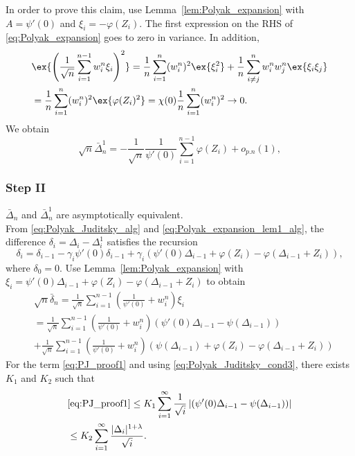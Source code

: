 In order to prove this claim, use Lemma~\ref{lem:Polyak_expansion} with $A = \psi'(0)$ and $\xi_i = -\varphi(Z_i)$. The first expression on the RHS of \eqref{eq:Polyak_expansion} goes to zero in variance. In addition, 
\begin{align*}
& \ex{ \left( \frac{1}{\sqrt{n}} \sum_{i=1}^{n-1} w_i^n \xi_i \right)^2 }  = \frac{1}{n}  \sum_{i=1}^n (w_i^n)^2 \ex{ \xi_i^2} + \frac{1}{n}  \sum_{i\neq j}^n w_i^n w_j^n \ex{ \xi_i \xi_j} \\
& = \frac{1}{n}  \sum_{i=1}^n (w_i^n)^2 \ex{ \varphi(Z_i)^2} = \chi(0) \frac{1}{n}  \sum_{i=1}^n (w_i^n)^2 \to 0. 
\end{align*}
We obtain
\begin{equation}
\sqrt{n} \bar{\Delta}^1_n = -\frac{1}{\sqrt{n}} \frac{1}{\psi'(0)} \sum_{i=1}^{n-1} \varphi(Z_i)+ o_{p.n}(1), \label{eq:Polyak_expansion_aux_process}
\end{equation}

\subsubsection*{Step II} $\bar{\Delta}_n$ and $\bar{\Delta}^1_n$ are asymptotically equivalent. \\

From \eqref{eq:Polyak_Juditsky_alg} and \eqref{eq:Polyak_expansion_lem1_alg}, the difference $\delta_i = \Delta_i - \Delta_i^1$ satisfies the recursion
\[
\delta_i = \delta_{i-1} - \gamma_i \psi'(0) \delta_{i-1} + \gamma_i \left( \psi'(0) \Delta_{i-1}  + \varphi(Z_i) - \varphi(\Delta_{i-1} + Z_i) \right),
\]
where $\delta_0 = 0$. Use Lemma~\ref{lem:Polyak_expansion} with $\xi_i =  \psi'(0) \Delta_{i-1}  + \varphi(Z_i) - \varphi(\Delta_{i-1} + Z_i)$ to obtain
\begin{align}
& \sqrt{n}\bar{\delta}_n = \frac{1}{\sqrt{n}} \sum_{i=1}^{n-1} \left( \frac{1}{\psi'(0)}  + w_i^n \right)  \xi_i  \\
& = \frac{1}{\sqrt{n}} \sum_{i=1}^{n-1} \left( \frac{1}{\psi'(0)}  + w_i^n \right)  \left( \psi'(0) \Delta_{i-1}  - \psi(\Delta_{i-1}) \right) \label{eq:PJ_proof1} \\
& + 
\frac{1}{\sqrt{n}} \sum_{i=1}^{n-1} \left( \frac{1}{\psi'(0)}  + w_i^n \right)  \left( \psi(\Delta_{i-1})  + \varphi(Z_i) - \varphi(\Delta_{i-1}+Z_i)
\right) \label{eq:PJ_proof2}
\end{align}
For the term \eqref{eq:PJ_proof1} and using \eqref{eq:Polyak_Juditsky_cond3}, there exists $K_1$ and $K_2$ such that 
\begin{align*}
& \eqref{eq:PJ_proof1}
\leq K_1 \sum_{i=1}^\infty \frac{1}{\sqrt{i}} \left| \left( \psi'(0) \Delta_{i-1}  - \psi(\Delta_{i-1}) \right) \right| \\
& \leq K_2 \sum_{i=1}^\infty \frac{ |\Delta_i|^{1+\lambda}}{\sqrt{i}}. 
\end{align*}

